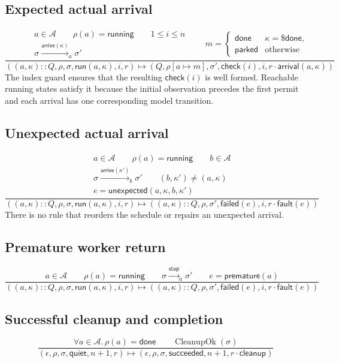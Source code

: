 \documentclass{article}
\newcommand{\Parked}{\mathsf{parked}}
\newcommand{\Running}{\mathsf{running}}
\newcommand{\Done}{\mathsf{done}}
\newcommand{\Quiet}{\mathsf{quiet}}
\newcommand{\Run}{\mathsf{run}}
\newcommand{\CheckPhase}{\mathsf{check}}
\newcommand{\Failed}{\mathsf{failed}}
\newcommand{\Succeeded}{\mathsf{succeeded}}
\newcommand{\CPDone}{\mathsf{\$done}}
\newcommand{\Stop}{\mathsf{stop}}
\begin{document}
\subsection*{Expected actual arrival}
\[
\frac{
  \begin{array}{c}
    a\in\mathcal A\qquad \rho(a)=\Running\qquad 1\le i\le n\\
    \sigma\xrightarrow{\mathsf{arrive}(\kappa)}_{a}\sigma'
  \end{array}\qquad
  m=\begin{cases}
    \Done&\kappa=\CPDone,\\
    \Parked&\text{otherwise}
  \end{cases}
}{
  ((a,\kappa)::Q,\rho,\sigma,\Run(a,\kappa),i,r)
  \longmapsto
  (Q,\rho[a\mapsto m],\sigma',\CheckPhase(i),i,
    r\cdot\mathsf{arrival}(a,\kappa))
}
\]
The index guard ensures that the resulting $\CheckPhase(i)$ is well formed.
Reachable running states satisfy it because the initial observation precedes
the first permit and each arrival has one corresponding model transition.

\subsection*{Unexpected actual arrival}
\[
\frac{
  \begin{array}{c}
    a\in\mathcal A\qquad \rho(a)=\Running\qquad b\in\mathcal A\\
    \sigma\xrightarrow{\mathsf{arrive}(\kappa')}_{b}\sigma'\qquad
    (b,\kappa')\ne(a,\kappa)\\
    e=\mathsf{unexpected}(a,\kappa,b,\kappa')
  \end{array}
}{
  ((a,\kappa)::Q,\rho,\sigma,\Run(a,\kappa),i,r)
  \longmapsto
  ((a,\kappa)::Q,\rho,\sigma',\Failed(e),i,r\cdot\mathsf{fault}(e))
}
\]
There is no rule that reorders the schedule or repairs an unexpected arrival.

\subsection*{Premature worker return}
\[
\frac{
  a\in\mathcal A\qquad \rho(a)=\Running\qquad
  \sigma\xrightarrow{\Stop}_{a}\sigma'\qquad
  e=\mathsf{premature}(a)
}{
  ((a,\kappa)::Q,\rho,\sigma,\Run(a,\kappa),i,r)
  \longmapsto
  ((a,\kappa)::Q,\rho,\sigma',\Failed(e),i,r\cdot\mathsf{fault}(e))
}
\]

\subsection*{Successful cleanup and completion}
\[
\frac{
  \forall a\in\mathcal A.\,\rho(a)=\Done\qquad
  \operatorname{CleanupOk}(\sigma)
}{
  (\epsilon,\rho,\sigma,\Quiet,n+1,r)
  \longmapsto
  (\epsilon,\rho,\sigma,\Succeeded,n+1,r\cdot\mathsf{cleanup})
}
\]
\end{document}
